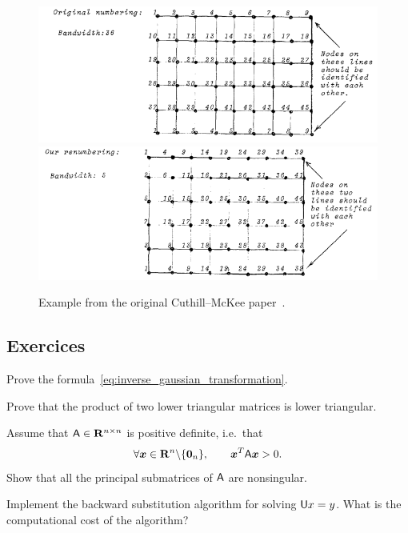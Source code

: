 \begin{figure}[ht]
    \centering
    \includegraphics[width=0.49\linewidth]{figures/linear_cuthill-mckee_original.png}
    \includegraphics[width=0.49\linewidth]{figures/linear_cuthill-mckee_improved.png}
    \caption{Example from the original Cuthill--McKee paper~\cite{cuthill1969reducing}.}%
    \label{figure:linear_example_from_cuthill_mckee}
\end{figure}

\subsection{Exercices}%
\begin{exercise}
    \label{exercise:inverse_gaussian_transformation}
    Prove the formula~\eqref{eq:inverse_gaussian_transformation}.
\end{exercise}

\begin{exercise}
    \label{exercise:linear_product_of_lower_triangular}
    Prove that the product of two lower triangular matrices is lower triangular.
\end{exercise}

\begin{exercise}
    \label{exercise:linear_positive_definite_matrix_nonsingular_principal_components}
    Assume that $\mathsf A \in \mathbf R^{n \times n}$ is positive definite,
    i.e.\ that
    \[
        \forall \mathbf{\boldsymbol{x}} \in \mathbf R^n \backslash \{ \mathbf{\boldsymbol{0}}_n \}, \qquad \mathbf{\boldsymbol{x}}^T \mathsf A \mathbf{\boldsymbol{x}} > 0.
    \]
    Show that all the principal submatrices of $\mathsf A$ are nonsingular.
\end{exercise}

\begin{compexercise}
    Implement the backward substitution algorithm for solving $\mathsf U x = y$.
    What is the computational cost of the algorithm?
\end{compexercise}

